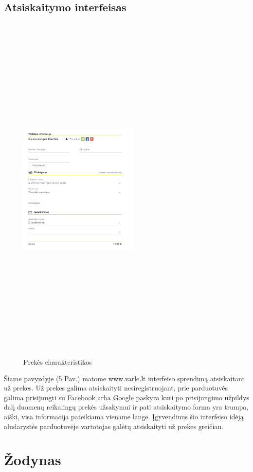 \documentclass[oneside]{VUMIFPSkursinis}
\begin{document}
	
	\subsection{Atsiskaitymo interfeisas}
		\begin{figure}[h]
			\centering
			\includegraphics[width=6cm,height=18cm,keepaspectratio]{IkvepiantisInterfeisas5.png}
			\caption{ Prekės charakteristikos}
		\end{figure}

			Šiame pavyzdyje (5 Pav.) matome www.varle.lt interfeiso sprendimą atsiskaitant už prekes. 
			Už prekes galima atsiskaityti nesiregistruojant, prie parduotuvės galima prisijungti su Facebook arba Google paskyra kuri po prisijungimo užpildys dalį duomenų reikalingų prekės užsakymui ir pati atsiskaitymo forma yra trumpa, aiški, visa informacija pateikiama viename lange. 
			Įgyvendinus šio interfeiso idėją aludarystės parduotuvėje vartotojas galėtų atsiskaityti už prekes greičiau.


\section{Žodynas}
\end{document}
